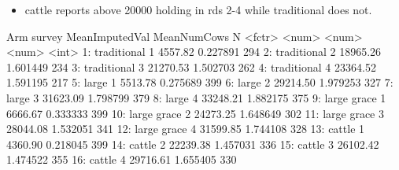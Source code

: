 
\begin{itemize}
\vspace{1.0ex}\setlength{\itemsep}{1.0ex}\setlength{\baselineskip}{12pt}
\item	\textsf{cattle} reports above 20000 holding in rds 2-4 while \textsf{traditional} does not.
\end{itemize}
\begin{Schunk}
\begin{Soutput}
            Arm survey MeanImputedVal MeanNumCows     N
         <fctr>  <num>          <num>       <num> <int>
 1: traditional      1        4557.82    0.227891   294
 2: traditional      2       18965.26    1.601449   234
 3: traditional      3       21270.53    1.502703   262
 4: traditional      4       23364.52    1.591195   217
 5:       large      1        5513.78    0.275689   399
 6:       large      2       29214.50    1.979253   327
 7:       large      3       31623.09    1.798799   379
 8:       large      4       33248.21    1.882175   375
 9: large grace      1        6666.67    0.333333   399
10: large grace      2       24273.25    1.648649   302
11: large grace      3       28044.08    1.532051   341
12: large grace      4       31599.85    1.744108   328
13:      cattle      1        4360.90    0.218045   399
14:      cattle      2       22239.38    1.457031   336
15:      cattle      3       26102.42    1.474522   355
16:      cattle      4       29716.61    1.655405   330
\end{Soutput}
\end{Schunk}




